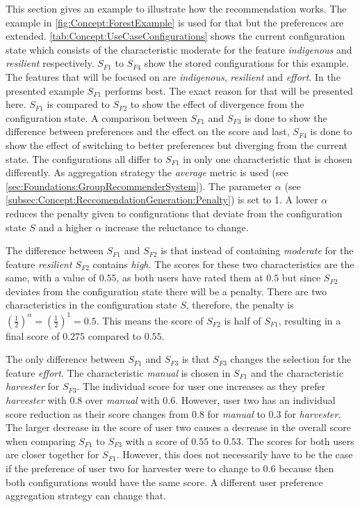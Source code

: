 This section gives an example to illustrate how the recommendation works. The example in \autoref{fig:Concept:ForestExample} is used for that but the preferences are extended. \autoref{tab:Concept:UseCaseConfigurations} shows the current configuration state which consists of the characteristic moderate for the feature \textit{indigenous} and  \textit{resilient} respectively. $S_{F1}$ to $S_{F4}$ show the stored configurations for this example. The features that will be focused on are \textit{indigenous}, \textit{resilient} and \textit{effort}. In the presented example $S_{F1}$ performs best. The exact reason for that will be presented here. $S_{F1}$ is compared to $S_{F2}$ to show the effect of divergence from the configuration state.  A comparison between $S_{F1}$  and $S_{F3}$ is done to show the difference between preferences and the effect on the score and last, $S_{F4}$ is done to show the effect of switching to better preferences but diverging from the current state. The configurations all differ to $S_{F1}$ in only one characteristic that is chosen differently. As aggregation strategy the \emph{average} metric is used (see \autoref{sec:Foundations:GroupRecommenderSystem}). The parameter $\alpha$ (see \autoref{subsec:Concept:ReccomendationGeneration:Penalty}) is set to 1. A lower $\alpha$ reduces the penalty given to configurations that deviate from the configuration state $S$ and a higher $\alpha$ increase the reluctance to change.

The difference between  $S_{F1}$ and  $S_{F2}$ is that instead of containing \emph{moderate} for the feature \emph{resilient} $S_{F2}$ contains \emph{high}. The scores for these two characteristics are the same, with a value of $0.55$, as both users have rated them at $0.5$ but since $S_{F2}$ deviates from the configuration state there will be a penalty. There are two characteristics in the configuration state $S$, therefore, the penalty is $(\frac{1}{2})^\alpha = (\frac{1}{2})^1 = 0.5$. This means the score of $S_{F2}$ is half of $S_{F1}$, resulting in a final score of $0.275$ compared to $0.55$.

The only difference between $S_{F1}$ and $S_{F3}$ is that $S_{F3}$ changes the selection for the feature \emph{effort}. The characteristic \emph{manual} is chosen in $S_{F1}$ and the characteristic \emph{harvester} for $S_{F3}$. The individual score for user one increases as they prefer \emph{harvester} with $0.8$ over \emph{manual} with $0.6$. However, user two has an individual score reduction as their score changes from $0.8$ for \emph{manual} to $0.3$ for \emph{harvester}. The larger decrease in the score of user two causes a decrease in the overall score when comparing  $S_{F1}$ to $S_{F3}$ with a score of $0.55$ to $0.53$. The scores for both users are closer together for $S_{F1}$. However, this does not necessarily have to be the case if the preference of user two for harvester were to change to $0.6$ because then both configurations would have the same score. A different user preference aggregation strategy can change that.


